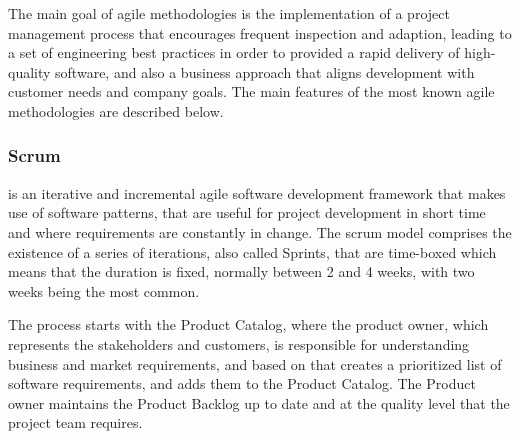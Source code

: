 The main goal of agile methodologies is the implementation of a project management process that encourages frequent inspection and adaption, leading to a set of engineering best practices in order to provided a rapid delivery of high-quality software, and also a business approach that aligns development with customer needs and company goals.
The main features of the most known agile methodologies are described below.
\subsubsection{Scrum}

is an iterative and incremental agile software development framework that makes use of software patterns, that are useful for project development in short time and where requirements are constantly in change. The scrum model comprises the existence of a series of iterations, also called Sprints, that are time-boxed which means that the duration is fixed, normally between 2 and 4 weeks, with two weeks being the most common. 

The process starts with the Product Catalog, where the product owner, which represents the stakeholders and customers, is responsible for understanding business and market requirements, and based on that creates a prioritized list of software requirements, and adds them to the Product Catalog. The Product owner maintains the Product Backlog up to date and at the quality level that the project team requires.

